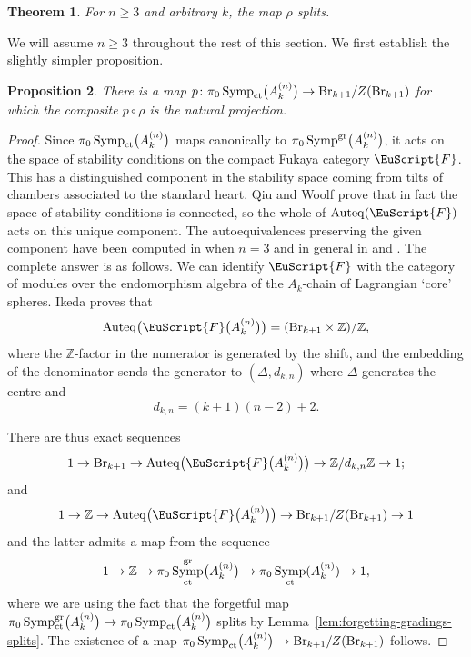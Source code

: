 \documentclass[pdftex]{sigma}
\DeclareMathOperator{\Auteq}{Auteq}
\newcommand{\scrF}{\EuScript{F}}
\DeclareMathOperator{\Symp}{Symp}
\def\bZ{\mathbb{Z}}
\newtheorem{thm}{Theorem}[section]
\newtheorem{prop}[thm]{Proposition}
\theoremstyle{definition}
\numberwithin{equation}{section}
\begin{document}
\begin{thm}\label{thm:milnor case}
For $n\geq 3$ and arbitrary $k$, the map $\rho$ splits.
\end{thm}

We will assume $n\geq 3$ throughout the rest of this section. We first establish the slightly simpler proposition.

\begin{prop}\label{prop:mod center}
There is a map $p\colon \pi_0\Symp_{\rm ct}\bigl(A_k^{(n)}\bigr) \to {\rm Br}_{k+1}/Z({\rm Br}_{k+1})$ for which the composite $p \circ \rho$ is the natural projection.
\end{prop}

\begin{proof}
Since $\pi_0\Symp_{\rm ct}\bigl(A_k^{(n)}\bigr)$ maps canonically to $\pi_0\Symp^{\rm gr}\bigr(A_k^{(n)}\bigr)$, it acts on the space of stability conditions on the compact Fukaya category $\scrF$. This has a distinguished component in the stability space coming from tilts of chambers associated to the standard heart. Qiu and Woolf \cite[Theorem~B]{Qiu-Woolf} prove that in fact the space of stability conditions is connected, so the whole of $\Auteq(\scrF)$ acts on this unique component. The autoequivalences preserving the given component have been computed in \cite[Theorem~9.9]{BS} when $n=3$ and in general in \cite[Theorem~7.16]{Ikeda} and \cite[Theorem~B]{Qiu-Woolf}. The complete answer is as follows. We can identify $\scrF$ with the category of modules over the endomorphism algebra of the $A_k$-chain of Lagrangian `core' spheres. Ikeda proves that
\begin{equation} \label{eqn:full aut group for A_k}
\Auteq\bigl(\scrF\bigl(A_k^{(n)}\bigr)\bigr) = ({\rm Br}_{k+1} \times \bZ) / \bZ,
\end{equation}
where the $\bZ$-factor in the numerator is generated by the shift, and the embedding of the denominator sends the generator to $(\Delta, d_{k,n})$ where $\Delta$ generates the centre and
\begin{equation} \label{eqn:dkn}
d_{k,n} = (k+1)(n-2) + 2.
\end{equation}

There are thus exact sequences
\begin{equation*}%
1 \to {\rm Br}_{k+1} \to \Auteq\bigl(\scrF\bigl(A_k^{(n)}\bigr)\bigr) \to \bZ/d_{k,n}\bZ \to 1;
\end{equation*}
and
\begin{equation*}%
1 \to \bZ \to \Auteq\bigl(\scrF\bigl(A_k^{(n)}\bigr)\bigr) \to {\rm Br}_{k+1}/Z({\rm Br}_{k+1}) \to 1
\end{equation*}
and the latter admits a map from the sequence
\[
1 \to \bZ \to \pi_0\Symp^{\rm gr}_{\rm ct}\bigl(A_k^{(n)}\bigr) \to \pi_0\Symp_{\rm ct}(A_k^{(n)}) \to 1,
\]
where we are using the fact that the forgetful map $ \pi_0\Symp^{\rm gr}_{\rm ct}\bigl(A_k^{(n)}\bigr) \to \pi_0\Symp_{\rm ct}\bigl(A_k^{(n)}\bigr)$ splits by Lemma~\ref{lem:forgetting-gradings-splits}.
The existence of a map $\pi_0\Symp_{\rm ct}\bigl(A_k^{(n)}\bigr) \to {\rm Br}_{k+1} / Z({\rm Br}_{k+1})$ follows.


\end{proof}
\end{document}
